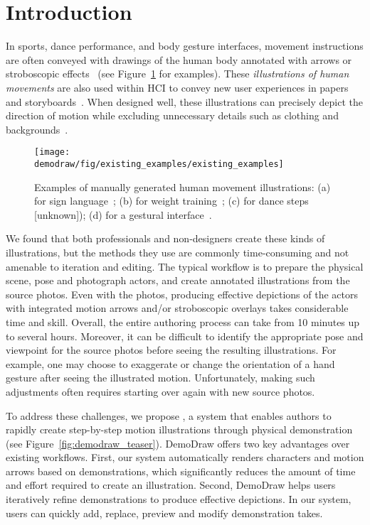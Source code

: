 
\section{Introduction}

In sports, dance performance, and body gesture interfaces, movement instructions are often conveyed with drawings of the human body annotated with arrows or stroboscopic effects~\cite{cutting_representing_2002} (see Figure~\ref{fig:existing_examples} for examples).
These \textit{illustrations of human movements} are also used within HCI to convey new user experiences in papers and storyboards~\cite{Buxton:2007:SUE:1526229}.
When designed well, these illustrations can precisely depict the direction of motion while excluding unnecessary details such as clothing and backgrounds~\cite{cutting_representing_2002}.

\begin{figure}[t]
  \centering
  \texttt{[image: \\demodraw/fig/existing\_examples/existing\_examples]}
  \caption{Examples of manually generated human movement illustrations: (a) for sign language~\protect\cite{corum:2012:sign}; (b) for weight training~\protect\cite{anderson2010stretching}; (c) for dance steps [unknown]); (d) for a gestural interface~\protect\cite{cohn2012humantenna}.}
  \label{fig:existing_examples}
\end{figure}

We found that both professionals and non-designers create these kinds of illustrations, but the methods they use are commonly time-consuming and not amenable to iteration and editing.
The typical workflow is to prepare the physical scene, pose and photograph actors, and create annotated illustrations from the source photos. Even with the photos, producing effective depictions of the actors with integrated motion arrows and/or stroboscopic overlays takes considerable time and skill. Overall, the entire authoring process can take from 10 minutes up to several hours. Moreover, it can be difficult to identify the appropriate pose and viewpoint for the source photos before seeing the resulting illustrations.
%
For example, one may choose to exaggerate or change the orientation of a hand gesture after seeing the illustrated motion.
%
Unfortunately, making such adjustments often requires starting over again with new source photos.

To address these challenges, we propose \systemname{}, a system that enables authors to rapidly create step-by-step motion illustrations through physical demonstration (see Figure~\ref{fig:demodraw_teaser}). DemoDraw offers two key advantages over existing workflows. First, our system automatically renders characters and motion arrows based on demonstrations, which significantly reduces the amount of time and effort required to create an illustration. Second, DemoDraw helps users iteratively refine demonstrations to produce effective depictions. In our system, users can quickly add, replace, preview and modify demonstration takes.

